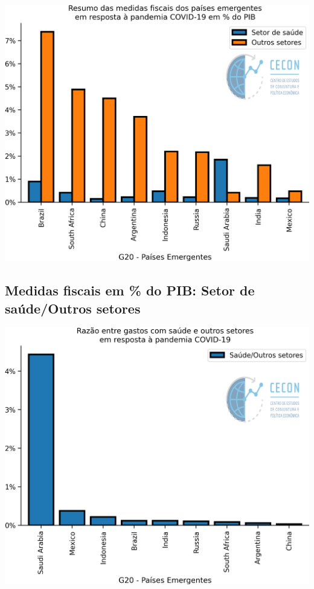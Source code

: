 \documentclass{SelfArx}
\begin{document}
\begin{center}
\includegraphics[width=.9\linewidth]{./figs/IMF/FiscalMonitor_Covid.png}
\end{center}

\subsection*{Medidas fiscais em \% do PIB: Setor de saúde/Outros setores}
\label{sec:org9526822}

\begin{center}
\includegraphics[width=.9\linewidth]{./figs/IMF/FiscalMonitor_Covid_ratio.png}
\end{center}
\end{document}
